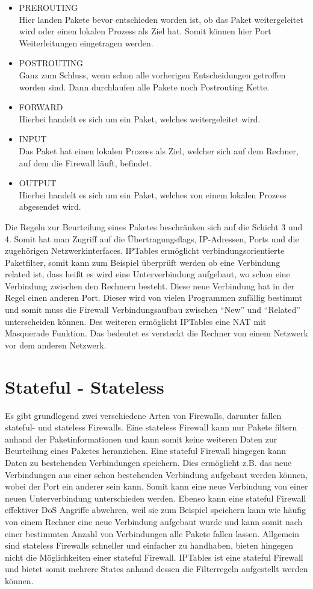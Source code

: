 \begin{itemize}
	\item PREROUTING \\
	Hier landen Pakete bevor entschieden worden ist, ob das Paket weitergeleitet wird oder einen lokalen Prozess als Ziel hat. Somit können hier Port Weiterleitungen eingetragen werden.
	\item POSTROUTING \\
	Ganz zum Schluss, wenn schon alle vorherigen Entscheidungen getroffen worden sind. Dann durchlaufen alle Pakete noch Postrouting Kette.
	\item FORWARD \\
	Hierbei handelt es sich um ein Paket, welches weitergeleitet wird.
	\item INPUT \\
	Das Paket hat einen lokalen Prozess als Ziel, welcher sich auf dem Rechner, auf dem die Firewall läuft, befindet.
	\item OUTPUT \\
	Hierbei handelt es sich um ein Paket, welches von einem lokalen Prozess abgesendet wird.
\end{itemize}
Die Regeln zur Beurteilung eines Paketes beschränken sich auf die Schicht 3 und 4. Somit hat man Zugriff auf die Übertragungsflags, IP-Adressen, Ports und die zugehörigen Netzwerkinterfaces. IPTables ermöglicht verbindungsorientierte Paketfilter, somit kann zum Beispiel überprüft werden ob eine Verbindung related ist, dass heißt es wird eine Unterverbindung aufgebaut, wo schon eine Verbindung zwischen den Rechnern besteht. Diese neue Verbindung hat in der Regel einen anderen Port. Dieser wird von vielen Programmen zufällig bestimmt und somit muss die Firewall Verbindungsaufbau zwischen "`New"' und "`Related"' unterscheiden können. Des weiteren ermöglicht IPTables eine NAT mit Masquerade Funktion. Das bedeutet es versteckt die Rechner von einem Netzwerk vor dem anderen Netzwerk.

\section{Stateful - Stateless}
Es gibt grundlegend zwei verschiedene Arten von Firewalls, darunter fallen stateful- und stateless Firewalls. Eine stateless Firewall kann nur Pakete filtern anhand der Paketinformationen und kann somit keine weiteren Daten zur Beurteilung eines Paketes heranziehen. Eine stateful Firewall hingegen kann Daten zu bestehenden Verbindungen speichern. Dies ermöglicht z.B. das neue Verbindungen aus einer schon bestehenden Verbindung aufgebaut werden können, wobei der Port ein anderer sein kann. Somit kann eine neue Verbindung von einer neuen Unterverbindung unterschieden werden. Ebenso kann eine stateful Firewall effektiver DoS Angriffe abwehren, weil sie zum Beispiel speichern kann wie häufig von einem Rechner eine neue Verbindung aufgebaut wurde und kann somit nach einer bestimmten Anzahl von Verbindungen alle Pakete fallen lassen. Allgemein sind stateless Firewalls schneller und einfacher zu handhaben, bieten hingegen nicht die Möglichkeiten einer stateful Firewall. IPTables ist eine stateful Firewall und bietet somit mehrere States anhand dessen die Filterregeln aufgestellt werden können.

